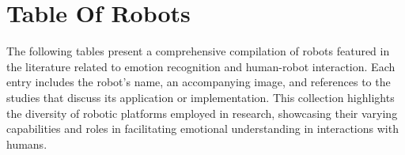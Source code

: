 \section{Table Of Robots}
The following tables present a comprehensive compilation of robots featured in the literature related to emotion recognition and human-robot interaction. Each entry includes the robot's name, an accompanying image, and references to the studies that discuss its application or implementation. This collection highlights the diversity of robotic platforms employed in research, showcasing their varying capabilities and roles in facilitating emotional understanding in interactions with humans.
\begin{table}[h]
\centering{}
\caption{Table of all Robots in Literature}
\hspace*{-1in}
\end{table}
